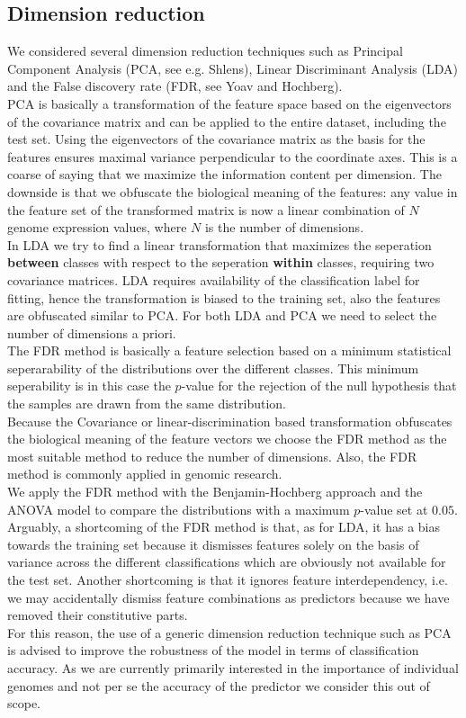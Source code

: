 \documentclass[a4paper,10pt]{article}
\begin{document}
\subsection{Dimension reduction}
%
We considered several dimension reduction techniques such as Principal Component Analysis (PCA, see e.g. Shlens\cite{Shlens2014}), 
Linear Discriminant Analysis (LDA) and the False discovery rate (FDR, see Yoav and Hochberg\cite{Yoav1995}). \\ 
%
PCA is basically a transformation of the feature space based on the eigenvectors 
of the covariance matrix and can be applied to the entire dataset, including the test set.
Using the eigenvectors of the covariance matrix as the basis for the features ensures maximal
variance perpendicular to the coordinate axes. This is a coarse of saying that we maximize the information
content per dimension. The downside is that we obfuscate the biological meaning of the features: any value in the feature set of the transformed matrix is now a linear combination 
of $N$ genome expression values, where $N$ is the number of dimensions. \\
%
In LDA we try to find a linear transformation that maximizes the seperation 
\textbf{between} classes with respect to the seperation \textbf{within} classes, requiring two
covariance matrices. LDA requires availability of the classification label for fitting, hence the transformation is biased to the training set, 
also the features are obfuscated similar to PCA. For both LDA and PCA we need to select the number of dimensions a priori. \\ 
%
The FDR method is basically a feature selection based on a minimum statistical seperarability of the distributions over the different classes.
This minimum seperability is in this case the $p$-value for the rejection of the null hypothesis that the samples are drawn from the same distribution.  \\ 
%
Because the Covariance or linear-discrimination based transformation obfuscates the biological meaning of the feature vectors
we choose the FDR method as the most suitable method to reduce the number of dimensions. Also, the FDR method is commonly applied in genomic research. \\
We apply the FDR method with the Benjamin-Hochberg approach and the ANOVA model to compare the distributions with a maximum $p$-value set at $0.05$. \\ %
%
Arguably, a shortcoming of the FDR method is that, as for LDA, it has a bias towards the training set because it dismisses features solely
on the basis of variance across the different classifications which are obviously not available for the test set. Another shortcoming is that it ignores
feature interdependency, i.e. we may accidentally dismiss feature combinations as predictors because we have removed their constitutive parts. \\ 
%
For this reason, the use of a generic dimension reduction technique such as PCA is advised to improve
the robustness of the model in terms of classification accuracy. As we are currently primarily interested in the importance of individual genomes and not per se the accuracy of the predictor
we consider this out of scope.
%
%
\end{document}
